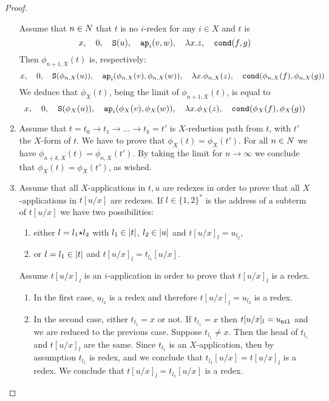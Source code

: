 \begin{proof}
\begin{enumerate}

Assume that $n \in {N}$ that $t$ is no $i$-redex for any $i \in X$ and $t$ is
$$ 
x, \ \ \  
0, \ \ \  
{\tt S}(u),  \ \ \  
{\tt ap}_i(v,w), \ \ \  
\lambda x.z, \ \ \  
{\tt cond}(f,g)
$$
Then $\phi_{n+1,X}(t)$ is, respectively:
$$ 
x, \ \ \  
0, \ \ \  
{\tt S}(\phi_{n,X}(u)),  \ \ \  
{\tt ap}_i(\phi_{n,X}(v),\phi_{n,X}(w)), \ \ \  
\lambda x.\phi_{n,X}(z), \ \ \  
{\tt cond}(\phi_{n,X}(f),\phi_{n,X}(g))
$$
We deduce that $\phi_X(t)$, being the limit of $\phi_{n+1,X}(t)$, is equal to
$$ 
x, \ \ \  
0, \ \ \  
{\tt S}(\phi_X(u)),  \ \ \  
{\tt ap}_i(\phi_X(v),\phi_X(w)), \ \ \  
\lambda x.\phi_X(z), \ \ \  
{\tt cond}(\phi_X(f),\phi_X(g))
$$
 

\item
Assume that $t=t_0 \rightarrow t_1 \rightarrow \ldots \rightarrow t_k = t'$ 
is  $X$-reduction path from $t$, with $t'$ the $X$-form of $t$. 
We have to prove that $\phi_X(t) = \phi_X(t')$.
For all $n \in {N}$ we have $\phi_{n+k,X} (t) = \phi_{n,X} (t')$.
By taking the limit for $n \rightarrow \infty$ 
we conclude that $\phi_X(t) = \phi_X(t')$, as wished.

\item
Assume that all $X$-applications in $t,u$ are redexes in order to prove that 
all $X$-applications in $t[u/x]$ are redexes.
If $l \in \{1,2\}^*$ is the address of a subterm of $t[u/x]$ we have two possibilities:

\begin{enumerate}
\item
either $l = l_1 {\star} l_2$ with $ l_1 \in {|t|}$, $ l_2 \in {|u|}$ and $t[u/x]_l = u_{l_2}$,
\item
or $l = l_1 \in {|t|}$ and $t[u/x]_l = t_{l_1}[u/x]$.
\end{enumerate}
Assume $t[u/x]_l$ is an $i$-application in order to prove that $t[u/x]_l$ is a redex.

\begin{enumerate}
\item
In the first case, $u_{l_2}$ is a redex and therefore $t[u/x]_l = u_{l_2}$ is a redex.
\item
In the second case, either $t_{l_1}=x$ or not. 
If   $t_{l_1}=x$ then $t[u/x]_l = u_{{\tt nil}}$ and we are reduced to the previous case.
Suppose  $t_{l_1}\not =x$. Then the head of $t_{l_1}$ and $t[u/x]_l$ are the same.
Since $t_{l_1}$ is an $X$-application, then by assumption $t_{l_1}$ is redex, and we
conclude that $t_{l_1}[u/x] = t[u/x]_l $ is a redex.
We conclude that $t[u/x]_l = t_{l_1}[u/x]$ is a redex.
\end{enumerate}


\end{enumerate}
\end{proof}
